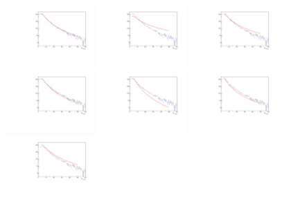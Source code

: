 \begin{figure}[bth]
\centering
\includegraphics[width=0.3\textwidth]{pPbcuts_2sig/unfolding/unfoldedSpectrum_prior0}
\includegraphics[width=0.3\textwidth]{pPbcuts_2sig/unfolding/unfoldedSpectrum_prior1}
\includegraphics[width=0.3\textwidth]{pPbcuts_2sig/unfolding/unfoldedSpectrum_prior2}
\includegraphics[width=0.3\textwidth]{pPbcuts_2sig/unfolding/unfoldedSpectrum_prior3}
\includegraphics[width=0.3\textwidth]{pPbcuts_2sig/unfolding/unfoldedSpectrum_prior4}
\includegraphics[width=0.3\textwidth]{pPbcuts_2sig/unfolding/unfoldedSpectrum_prior6}
\includegraphics[width=0.3\textwidth]{pPbcuts_2sig/unfolding/unfoldedSpectrum_prior7}

\end{figure}

